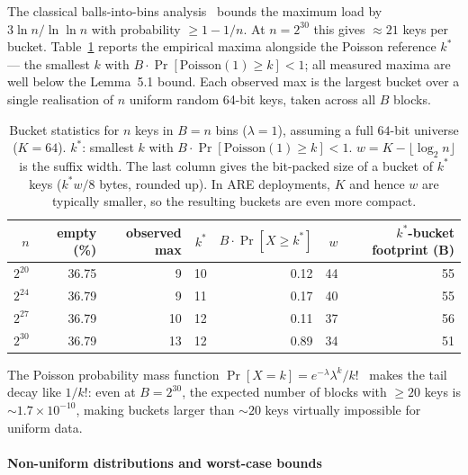 The classical balls-into-bins analysis~\citep[Lemma~5.1]{mitzenmacher2017probability}
bounds the maximum load by $3\ln n / \ln\ln n$ with probability $\geq 1 - 1/n$.
At $n = 2^{30}$ this gives $\approx 21$ keys per bucket.
Table~\ref{tab:ere-bucket-stats} reports the empirical maxima alongside the
Poisson reference $k^*$ --- the smallest $k$ with $B \cdot \Pr[\mathrm{Poisson}(1) \geq k] < 1$;
all measured maxima are well below the Lemma~5.1 bound.
Each observed max is the largest bucket over a single realisation of $n$ uniform
random 64-bit keys, taken across all $B$ blocks.

\begin{table}[H]
    \centering
    \begin{tabular}{@{}rrrrrrr@{}}
        \toprule
        $n$ & empty (\%) & observed max & $k^*$ & $B \cdot \Pr[X \geq k^*]$ & $w$ & $k^*$-bucket footprint (B) \\
        \midrule
        $2^{20}$ & 36.75 & 9  & 10 & 0.12 & 44 & 55 \\
        $2^{24}$ & 36.79 & 9  & 11 & 0.17 & 40 & 55 \\
        $2^{27}$ & 36.79 & 10 & 12 & 0.11 & 37 & 56 \\
        $2^{30}$ & 36.79 & 13 & 12 & 0.89 & 34 & 51 \\
        \bottomrule
    \end{tabular}
    \caption{Bucket statistics for $n$ keys in $B = n$ bins ($\lambda = 1$),
        assuming a full $64$-bit universe ($K = 64$).
        $k^*$: smallest $k$ with $B \cdot \Pr[\mathrm{Poisson}(1) \geq k] < 1$.
        $w = K - \lfloor \log_2 n \rfloor$ is the suffix width.
        The last column gives the bit-packed size of a bucket of $k^*$ keys
        ($k^* w / 8$ bytes, rounded up). In ARE deployments, $K$ and hence
        $w$ are typically smaller, so the resulting buckets are even more
        compact.}
    \label{tab:ere-bucket-stats}
\end{table}

The Poisson probability mass function $\Pr[X = k] = e^{-\lambda}\lambda^k/k!$~\citep[eq.~(6.1)]{feller1968introduction}
makes the tail decay like $1/k!$: even at $B = 2^{30}$, the expected number of
blocks with $\geq 20$ keys is ${\sim}1.7 \times 10^{-10}$, making buckets larger
than ${\sim}20$ keys virtually impossible for uniform data.

\paragraph{Non-uniform distributions and worst-case bounds}

